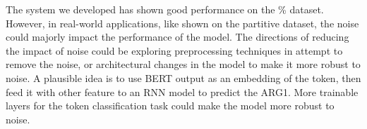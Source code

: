 \documentclass[11pt]{article}
\begin{document}
The system we developed has shown good performance on the \% dataset. However, in real-world applications, like shown on the partitive dataset, the noise could majorly impact the performance of the model. The directions of reducing the impact of noise could be exploring preprocessing techniques in attempt to remove the noise, or architectural changes in the model to make it more robust to noise. A plausible idea is to use BERT output as an embedding of the token, then feed it with other feature to an RNN model to predict the ARG1. More trainable layers for the token classification task could make the model more robust to noise.



\end{document}
